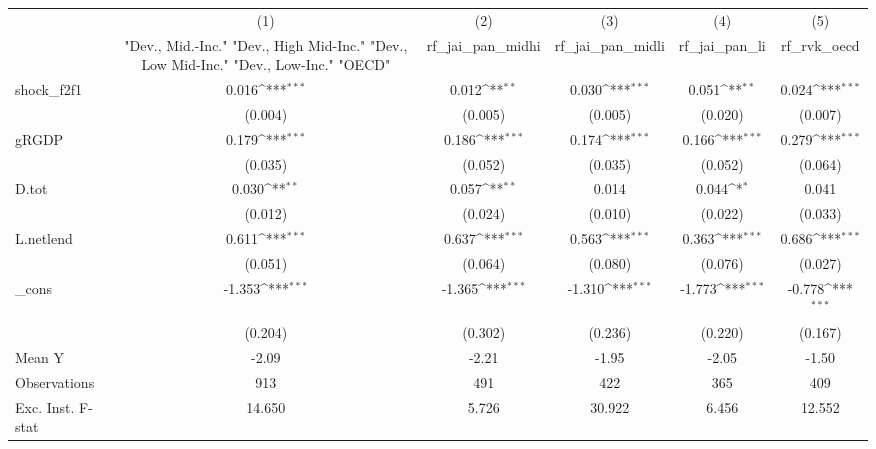 {
\def\sym#1{\ifmmode^{#1}\else\(^{#1}\)\fi}
\begin{tabular}{l*{5}{c}}
\toprule
            &\multicolumn{1}{c}{(1)}&\multicolumn{1}{c}{(2)}&\multicolumn{1}{c}{(3)}&\multicolumn{1}{c}{(4)}&\multicolumn{1}{c}{(5)}\\
            &\multicolumn{1}{c}{ "Dev., Mid.-Inc." "Dev., High Mid-Inc." "Dev., Low Mid-Inc." "Dev., Low-Inc." "OECD" }&\multicolumn{1}{c}{rf\_jai\_pan\_midhi}&\multicolumn{1}{c}{rf\_jai\_pan\_midli}&\multicolumn{1}{c}{rf\_jai\_pan\_li}&\multicolumn{1}{c}{rf\_rvk\_oecd}\\
\midrule
shock\_f2f1  &       0.016\sym{***}&       0.012\sym{**} &       0.030\sym{***}&       0.051\sym{**} &       0.024\sym{***}\\
            &     (0.004)         &     (0.005)         &     (0.005)         &     (0.020)         &     (0.007)         \\
\addlinespace
gRGDP       &       0.179\sym{***}&       0.186\sym{***}&       0.174\sym{***}&       0.166\sym{***}&       0.279\sym{***}\\
            &     (0.035)         &     (0.052)         &     (0.035)         &     (0.052)         &     (0.064)         \\
\addlinespace
D.tot       &       0.030\sym{**} &       0.057\sym{**} &       0.014         &       0.044\sym{*}  &       0.041         \\
            &     (0.012)         &     (0.024)         &     (0.010)         &     (0.022)         &     (0.033)         \\
\addlinespace
L.netlend   &       0.611\sym{***}&       0.637\sym{***}&       0.563\sym{***}&       0.363\sym{***}&       0.686\sym{***}\\
            &     (0.051)         &     (0.064)         &     (0.080)         &     (0.076)         &     (0.027)         \\
\addlinespace
\_cons      &      -1.353\sym{***}&      -1.365\sym{***}&      -1.310\sym{***}&      -1.773\sym{***}&      -0.778\sym{***}\\
            &     (0.204)         &     (0.302)         &     (0.236)         &     (0.220)         &     (0.167)         \\
\midrule
Mean Y      &       -2.09         &       -2.21         &       -1.95         &       -2.05         &       -1.50         \\
Observations&         913         &         491         &         422         &         365         &         409         \\
Exc. Inst. F-stat&      14.650         &       5.726         &      30.922         &       6.456         &      12.552         \\
\bottomrule
\end{tabular}
}
